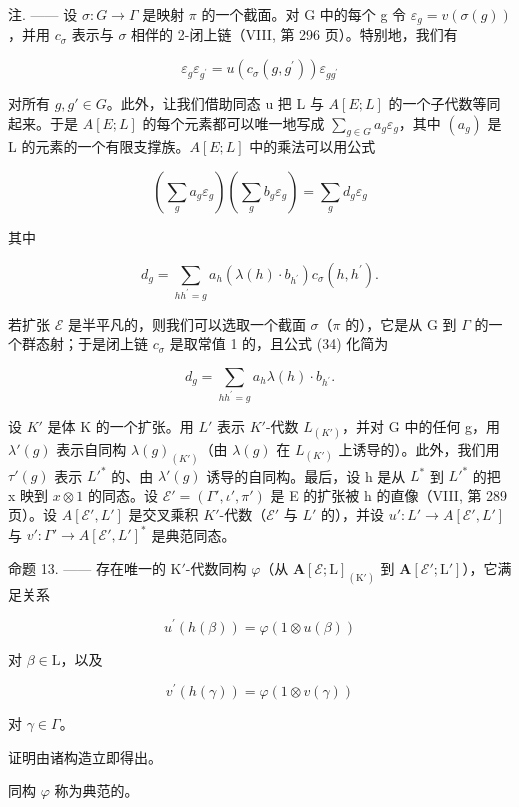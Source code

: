 注. —— 设 \(\sigma: G \to \Gamma\) 是映射 \(\pi\) 的一个截面。对 G 中的每个 g 令 \(\varepsilon_{g} = v(\sigma(g))\)，并用 \(c_{\sigma}\) 表示与 \(\sigma\) 相伴的 2-闭上链（VIII, 第 296 页）。特别地，我们有

\[
\varepsilon_ {g} \varepsilon_ {g ^ {\prime}} = u (c _ {\sigma} (g, g ^ {\prime})) \varepsilon_ {g g ^ {\prime}}\tag{32}
\]

对所有 \(g, g' \in G\)。此外，让我们借助同态 u 把 L 与 \(A[E; L]\) 的一个子代数等同起来。于是 \(A[E; L]\) 的每个元素都可以唯一地写成 \(\sum_{g \in G} a_g \varepsilon_g\)，其中 \((a_g)\) 是 L 的元素的一个有限支撑族。\(A[E; L]\) 中的乘法可以用公式

\[
\left(\sum_ {g} a _ {g} \varepsilon_ {g}\right) \left(\sum_ {g} b _ {g} \varepsilon_ {g}\right) = \sum_ {g} d _ {g} \varepsilon_ {g}\tag{33}
\]

其中

\[
d _ {g} = \sum_ {h h ^ {\prime} = g} a _ {h} (\lambda (h) \cdot b _ {h ^ {\prime}}) c _ {\sigma} (h, h ^ {\prime}).\tag{34}
\]

若扩张 \(\mathcal{E}\) 是半平凡的，则我们可以选取一个截面 \(\sigma\)（\(\pi\) 的），它是从 G 到 \(\Gamma\) 的一个群态射；于是闭上链 \(c_{\sigma}\) 是取常值 1 的，且公式 (34) 化简为

\[
d _ {g} = \sum_ {h h ^ {\prime} = g} a _ {h} \lambda (h) \cdot b _ {h ^ {\prime}}.\tag{35}
\]

设 \(K'\) 是体 K 的一个扩张。用 \(L'\) 表示 \(K'\)-代数 \(L_{(K')}\)，并对 G 中的任何 g，用 \(\lambda'(g)\) 表示自同构 \(\lambda(g)_{(K')}\)（由 \(\lambda(g)\) 在 \(L_{(K')}\) 上诱导的）。此外，我们用 \(\tau'(g)\) 表示 \(L'^*\) 的、由 \(\lambda'(g)\) 诱导的自同构。最后，设 h 是从 \(L^*\) 到 \(L'^*\) 的把 x 映到 \(x \otimes 1\) 的同态。设 \(\mathcal{E}' = (\Gamma', \iota', \pi')\) 是 E 的扩张被 h 的直像（VIII, 第 289 页）。设 \(A[\mathcal{E}', L']\) 是交叉乘积 \(K'\)-代数（\(\mathcal{E}'\) 与 \(L'\) 的），并设 \(u': L' \to A[\mathcal{E}', L']\) 与 \(v': \Gamma' \to A[\mathcal{E}', L']^*\) 是典范同态。

命题 13. —— 存在唯一的 \(\mathrm{K}'\)-代数同构 \(\varphi\)（从 \(\mathbf{A}[\mathcal{E};\mathrm{L}]_{(\mathrm{K}')}\) 到 \(\mathbf{A}[\mathcal{E}';\mathrm{L}']\)），它满足关系

\[
u ^ {\prime} (h (\beta)) = \varphi (1 \otimes u (\beta))\tag{36}
\]

对 \(\beta \in \mathrm{L}\)，以及

\[
v ^ {\prime} (h (\gamma)) = \varphi (1 \otimes v (\gamma))\tag{37}
\]

对 \(\gamma\in\Gamma\)。

证明由诸构造立即得出。

同构 \(\varphi\) 称为典范的。
\relax{}
